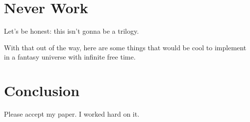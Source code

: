 \documentclass[10pt]{sigplanconf}
\begin{document}

\section{Never Work}

Let's be honest: this isn't gonna be a trilogy.

With that out of the way, here are some things that would be cool to implement in a fantasy universe with infinite free time.


\section{Conclusion}

Please accept my paper.
I worked hard on it.




\end{document}

